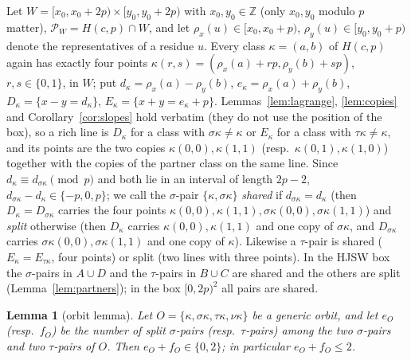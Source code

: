 \documentclass[11pt]{article}
\newtheorem{lemma}[theorem]{Lemma}
\theoremstyle{remark}
\newcommand{\Z}{\mathbb{Z}}
\newcommand{\Hc}{H(c,p)}
\newcommand{\Pset}{\mathcal{P}}
\begin{document}
Let $W=[x_0,x_0+2p)\times[y_0,y_0+2p)$ with $x_0,y_0\in\Z$ (only $x_0,y_0$ modulo $p$ matter), $\Pset_W=\Hc\cap W$, and let
$\rho_x(u)\in[x_0,x_0+p)$, $\rho_y(u)\in[y_0,y_0+p)$ denote the representatives of a residue $u$.  Every class $\kappa=(a,b)$
of $\Hc$ again has exactly four points $\kappa(r,s)=(\rho_x(a)+rp,\rho_y(b)+sp)$, $r,s\in\{0,1\}$, in $W$; put
$d_\kappa=\rho_x(a)-\rho_y(b)$, $e_\kappa=\rho_x(a)+\rho_y(b)$, $D_\kappa=\{x-y=d_\kappa\}$, $E_\kappa=\{x+y=e_\kappa+p\}$.
Lemmas~\ref{lem:lagrange}, \ref{lem:copies} and Corollary~\ref{cor:slopes} hold verbatim (they do not use the position of
the box), so a rich line is $D_\kappa$ for a class with $\sigma\kappa\ne\kappa$ or $E_\kappa$ for a class with $\tau\kappa\ne\kappa$,
and its points are the two copies $\kappa(0,0),\kappa(1,1)$ (resp.\ $\kappa(0,1),\kappa(1,0)$) together with the copies of the
partner class on the same line.  Since $d_\kappa\equiv d_{\sigma\kappa}\pmod p$ and both lie in an interval of length $2p-2$,
$d_{\sigma\kappa}-d_\kappa\in\{-p,0,p\}$; we call the $\sigma$-pair $\{\kappa,\sigma\kappa\}$ \emph{shared} if
$d_{\sigma\kappa}=d_\kappa$ (then $D_\kappa=D_{\sigma\kappa}$ carries the four points $\kappa(0,0),\kappa(1,1),\sigma\kappa(0,0),
\sigma\kappa(1,1)$) and \emph{split} otherwise (then $D_\kappa$ carries $\kappa(0,0),\kappa(1,1)$ and one copy of $\sigma\kappa$,
and $D_{\sigma\kappa}$ carries $\sigma\kappa(0,0),\sigma\kappa(1,1)$ and one copy of $\kappa$).  Likewise a $\tau$-pair is
shared ($E_\kappa=E_{\tau\kappa}$, four points) or split (two lines with three points).  In the HJSW box the $\sigma$-pairs in
$A\cup D$ and the $\tau$-pairs in $B\cup C$ are shared and the others are split (Lemma~\ref{lem:partners}); in the box
$[0,2p)^2$ all pairs are shared.

\begin{lemma}[orbit lemma]\label{lem:orbit}
Let $O=\{\kappa,\sigma\kappa,\tau\kappa,\nu\kappa\}$ be a generic orbit, and let $e_O$ (resp.\ $f_O$) be the number of split
$\sigma$-pairs (resp.\ $\tau$-pairs) among the two $\sigma$-pairs and two $\tau$-pairs of $O$.  Then $e_O+f_O\in\{0,2\}$; in
particular $e_O+f_O\le2$.
\end{lemma}
\end{document}
